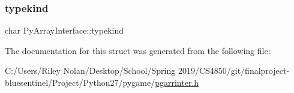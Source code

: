 \subsubsection{\texorpdfstring{typekind}{typekind}}
{\footnotesize\ttfamily char Py\+Array\+Interface\+::typekind}



The documentation for this struct was generated from the following file\+:\begin{DoxyCompactItemize}
\item 
C\+:/\+Users/\+Riley Nolan/\+Desktop/\+School/\+Spring 2019/\+C\+S4850/git/finalproject-\/bluesentinel/\+Project/\+Python27/pygame/\mbox{\hyperlink{pgarrinter_8h}{pgarrinter.\+h}}\end{DoxyCompactItemize}
